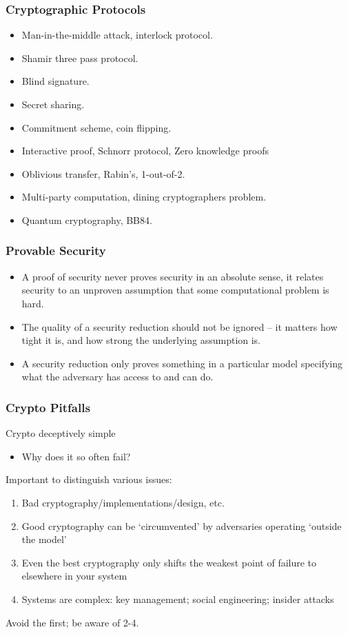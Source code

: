 \begin{frame}\frametitle{Cryptographic Protocols}
\begin{itemize}
\item Man-in-the-middle attack, interlock protocol.
\item Shamir three pass protocol.
\item Blind signature.
\item Secret sharing.
\item Commitment scheme, coin flipping.
\item Interactive proof, Schnorr protocol, Zero knowledge proofs
\item Oblivious transfer, Rabin's, 1-out-of-2.
\item Multi-party computation, dining cryptographers problem.
\item Quantum cryptography, BB84.
\end{itemize}
\end{frame}
\begin{frame}\frametitle{Provable Security}
\begin{itemize}
\item A proof of security never proves security in an absolute sense, it relates security to an unproven assumption that some computational problem is hard.
\item The quality of a security reduction should not be ignored -- it matters how tight it is, and how strong the underlying assumption is.
\item A security reduction only proves something in a particular model specifying what the adversary has access to and can do.
\end{itemize}
\end{frame}
\begin{frame}\frametitle{Crypto Pitfalls}
Crypto deceptively simple
\begin{itemize}
\item Why does it so often fail?
\end{itemize}
Important to distinguish various issues:
\begin{enumerate}
\item Bad cryptography/implementations/design, etc.
\item Good cryptography can be `circumvented' by adversaries operating `outside the model'
\item Even the best cryptography only shifts the weakest point of failure to elsewhere in your system
\item Systems are complex: key management; social engineering; insider attacks
\end{enumerate}
Avoid the first; be aware of 2-4.
\end{frame}
